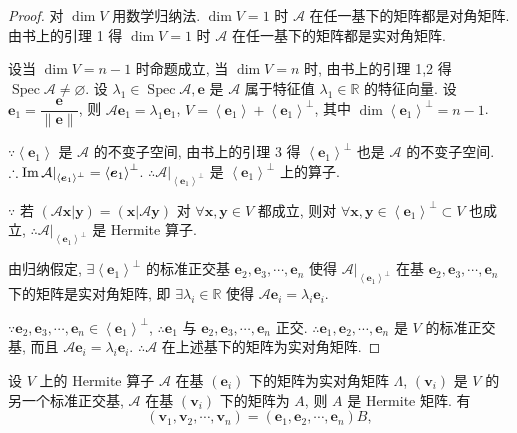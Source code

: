 \documentclass[color=black,device=normal,lang=cn,mode=geye]{elegantnote}
\begin{document}
\begin{proof}
    对 $\dim V$ 用数学归纳法. $\dim V=1$ 时 $\mathcal{A}$ 在任一基下的矩阵都是对角矩阵. 由书上的引理 1 得 $\dim V=1$ 时 $\mathcal{A}$ 在任一基下的矩阵都是实对角矩阵.

    设当 $\dim V=n-1$ 时命题成立, 当 $\dim V=n$ 时, 由书上的引理 1,2 得 $\operatorname{Spec}\mathcal{A}\neq\varnothing$. 设 $\lambda_1\in\operatorname{Spec}\mathcal{A},\boldsymbol{e}$ 是 $\mathcal{A}$ 属于特征值 $\lambda_1\in\mathbb{R}$ 的特征向量. 设 $\boldsymbol{e}_1=\dfrac{\boldsymbol{e}}{\|\boldsymbol{e}\|}$, 则 $\mathcal{A}\boldsymbol{e}_1=\lambda_1\boldsymbol{e}_1$, $V=\left<\boldsymbol{e}_1\right>+\left<\boldsymbol{e}_1\right>^\perp$, 其中 $\dim\left<\boldsymbol{e}_1\right>^\perp=n-1$.

    $\because\left<\boldsymbol{e}_1\right>$ 是 $\mathcal{A}$ 的不变子空间, 由书上的引理 3 得 $\left<\boldsymbol{e}_1\right>^\perp$ 也是 $\mathcal{A}$ 的不变子空间. $\therefore\operatorname{Im} \mathcal{A}|_{\left<\boldsymbol{e}_1\right>^\perp}=\left<\boldsymbol{e}_1\right>^\perp$. $\therefore\mathcal{A}|_{\left<\boldsymbol{e}_1\right>^\perp}$ 是 $\left<\boldsymbol{e}_1\right>^\perp$ 上的算子.

    $\because$ 若 $(\mathcal{A}\boldsymbol{x}|\boldsymbol{y})=(\boldsymbol{x}|\mathcal{A}\boldsymbol{y})$ 对 $\forall\boldsymbol{x},\boldsymbol{y}\in V$ 都成立, 则对 $\forall\boldsymbol{x},\boldsymbol{y}\in\left<\boldsymbol{e}_1\right>^\perp\subset V$ 也成立, $\therefore\mathcal{A}|_{\left<\boldsymbol{e}_1\right>^\perp}$ 是 Hermite 算子.

    由归纳假定, $\exists\left<\boldsymbol{e}_1\right>^\perp$ 的标准正交基 $\boldsymbol{e}_2,\boldsymbol{e}_3,\cdots,\boldsymbol{e}_n$ 使得 $\mathcal{A}|_{\left<\boldsymbol{e}_1\right>^\perp}$ 在基 $\boldsymbol{e}_2,\boldsymbol{e}_3,\cdots,\boldsymbol{e}_n$ 下的矩阵是实对角矩阵, 即 $\exists\lambda_i\in\mathbb{R}$ 使得 $\mathcal{A}\boldsymbol{e}_i=\lambda_i\boldsymbol{e}_i$.

    $\because\boldsymbol{e}_2,\boldsymbol{e}_3,\cdots,\boldsymbol{e}_n\in\left<\boldsymbol{e}_1\right>^\perp$, $\therefore\boldsymbol{e}_1$ 与 $\boldsymbol{e}_2,\boldsymbol{e}_3,\cdots,\boldsymbol{e}_n$ 正交. $\therefore\boldsymbol{e}_1,\boldsymbol{e}_2,\cdots,\boldsymbol{e}_n$ 是 $V$ 的标准正交基, 而且 $\mathcal{A}\boldsymbol{e}_i=\lambda_i\boldsymbol{e}_i$. $\therefore\mathcal{A}$ 在上述基下的矩阵为实对角矩阵.
\end{proof}
设 $V$ 上的 Hermite 算子 $\mathcal{A}$ 在基 $(\boldsymbol{e}_i)$ 下的矩阵为实对角矩阵 $\Lambda$, $(\boldsymbol{v}_i)$ 是 $V$ 的另一个标准正交基, $\mathcal{A}$ 在基 $(\boldsymbol{v}_i)$ 下的矩阵为 $A$, 则 $A$ 是 Hermite 矩阵. 有
\[(\boldsymbol{v}_1,\boldsymbol{v}_2,\cdots,\boldsymbol{v}_n)=(\boldsymbol{e}_1,\boldsymbol{e}_2,\cdots,\boldsymbol{e}_n)B,\]
\end{document}

